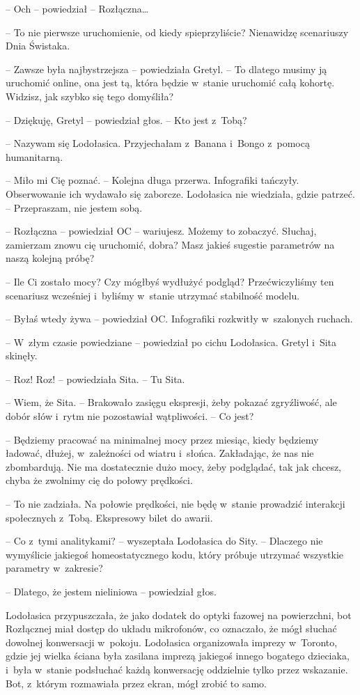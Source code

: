 \documentclass[oneside,polish,11pt,sfheadings]{mwbk}
\begin{document}
-- Och -- powiedział -- Rozłączna\ldots 

-- To nie pierwsze uruchomienie, od kiedy spieprzyliście? Nienawidzę
scenariuszy Dnia Świstaka.

-- Zawsze była najbystrzejsza -- powiedziała Gretyl. -- To dlatego musimy
ją uruchomić online, ona jest tą, która będzie w~stanie uruchomić całą
kohortę. Widzisz, jak szybko się tego domyśliła?

-- Dziękuję, Gretyl -- powiedział głos. -- Kto jest z~Tobą?

-- Nazywam się Lodołasica. Przyjechałam z~Banana i~Bongo z~pomocą
humanitarną.

-- Miło mi Cię poznać. -- Kolejna długa przerwa. Infografiki tańczyły.
Obserwowanie ich wydawało się zaborcze. Lodołasica nie wiedziała, gdzie
patrzeć. -- Przepraszam, nie jestem sobą.

-- Rozłączna -- powiedział OC -- wariujesz. Możemy to zobaczyć. Słuchaj,
zamierzam znowu cię uruchomić, dobra? Masz jakieś sugestie parametrów na
naszą kolejną próbę?

-- Ile Ci zostało mocy? Czy mógłbyś wydłużyć podgląd? Przećwiczyliśmy ten
scenariusz wcześniej i~byliśmy w~stanie utrzymać stabilność modelu.

-- Byłaś wtedy żywa -- powiedział OC. Infografiki rozkwitły w~szalonych
ruchach.

-- W~złym czasie powiedziane -- powiedział po cichu Lodołasica. Gretyl i~Sita skinęły.

-- Roz! Roz! -- powiedziała Sita. -- Tu Sita.

-- Wiem, że Sita. -- Brakowało zasięgu ekspresji, żeby pokazać
zgryźliwość, ale dobór słów i~rytm nie pozostawiał wątpliwości. -- Co
jest?

-- Będziemy pracować na minimalnej mocy przez miesiąc, kiedy będziemy
ładować, dłużej, w~zależności od wiatru i~słońca. Zakładając, że nas nie
zbombardują. Nie ma dostatecznie dużo mocy, żeby podglądać, tak jak
chcesz, chyba że zwolnimy cię do połowy prędkości.

-- To nie zadziała. Na połowie prędkości, nie będę w~stanie prowadzić
interakcji społecznych z~Tobą. Ekspresowy bilet do awarii.

-- Co z~tymi analitykami? -- wyszeptała Lodołasica do Sity. -- Dlaczego nie
wymyślicie jakiegoś homeostatycznego kodu, który próbuje utrzymać
wszystkie parametry w~zakresie?

-- Dlatego, że jestem nieliniowa -- powiedział głos. 

Lodołasica
przypuszczała, że jako dodatek do optyki fazowej na powierzchni, bot
Rozłącznej miał dostęp do układu mikrofonów, co oznaczało, że mógł
słuchać dowolnej konwersacji w~pokoju. Lodołasica organizowała imprezy w~Toronto, gdzie jej wielka ściana była zasilana imprezą jakiegoś innego
bogatego dzieciaka, i~była w~stanie podsłuchać każdą konwersację
oddzielnie tylko przez wskazanie. Bot, z~którym rozmawiała przez ekran,
mógł zrobić to samo.
\end{document}

